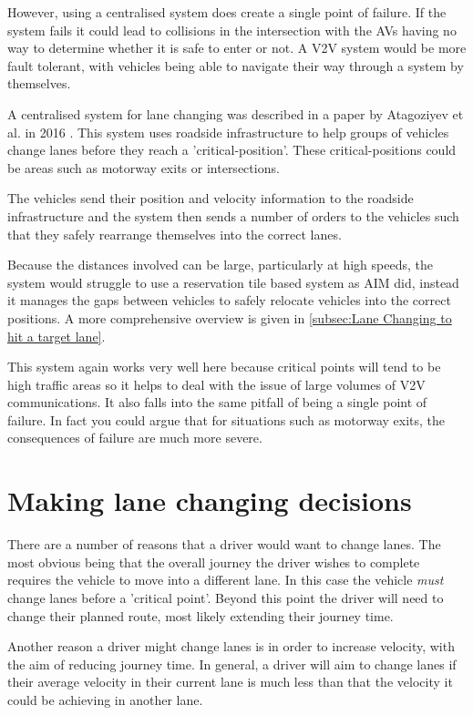 However, using a centralised system does create a single point of failure. If the system fails it could lead to collisions in the intersection with the AVs having no way to determine whether it is safe to enter or not. A V2V system would be more fault tolerant, with vehicles being able to navigate their way through a system by themselves.

A centralised system for lane changing was described in a paper by Atagoziyev et al. in 2016 \citep{Atagoziyev2016}. This system uses roadside infrastructure to help groups of vehicles change lanes before they reach a 'critical-position'. These critical-positions could be areas such as motorway exits or intersections.

The vehicles send their position and velocity information to the roadside infrastructure and the system then sends a number of orders to the vehicles such that they safely rearrange themselves into the correct lanes. 

Because the distances involved can be large, particularly at high speeds, the system would struggle to use a reservation tile based system as AIM did, instead it manages the gaps between vehicles to safely relocate vehicles into the correct positions. A more comprehensive overview is given in \ref{subsec:Lane Changing to hit a target lane}.

This system again works very well here because critical points will tend to be high traffic areas so it helps to deal with the issue of large volumes of V2V communications. It also falls into the same pitfall of being a single point of failure. In fact you could argue that for situations such as motorway exits, the consequences of failure are much more severe.

\section{Making lane changing decisions}
\label{sec:Making lane changing decisions}
There are a number of reasons that a driver would want to change lanes. The most obvious being that the overall journey the driver wishes to complete requires the vehicle to move into a different lane. In this case the vehicle \emph{must} change lanes before a 'critical point'. Beyond this point the driver will need to change their planned route, most likely extending their journey time. 

Another reason a driver might change lanes is in order to increase velocity, with the aim of reducing journey time. In general, a driver will aim to change lanes if their average velocity in their current lane is much less than that the velocity it could be achieving in another lane.

